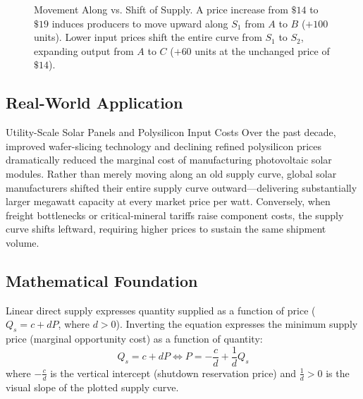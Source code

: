 \documentclass[11pt,letterpaper]{article}
\begin{document}
\begin{figure}[htbp]
\caption{Movement Along vs. Shift of Supply. A price increase from $\$14$ to $\$19$ induces producers to move upward along $S_1$ from $A$ to $B$ ($+100$ units). Lower input prices shift the entire curve from $S_1$ to $S_2$, expanding output from $A$ to $C$ ($+60$ units at the unchanged price of $\$14$).}
\label{fig:supply_shift_vs_movement}
\end{figure}

\subsection*{Real-World Application}
\begin{examplecase}{Utility-Scale Solar Panels and Polysilicon Input Costs}
Over the past decade, improved wafer-slicing technology and declining refined polysilicon prices dramatically reduced the marginal cost of manufacturing photovoltaic solar modules. Rather than merely moving along an old supply curve, global solar manufacturers shifted their entire supply curve outward—delivering substantially larger megawatt capacity at every market price per watt. Conversely, when freight bottlenecks or critical-mineral tariffs raise component costs, the supply curve shifts leftward, requiring higher prices to sustain the same shipment volume.
\end{examplecase}

\subsection*{Mathematical Foundation}
Linear direct supply expresses quantity supplied as a function of price ($Q_s = c + dP$, where $d > 0$). Inverting the equation expresses the minimum supply price (marginal opportunity cost) as a function of quantity:
\begin{equation}
Q_s = c + dP \iff P = -\frac{c}{d} + \frac{1}{d}Q_s
\end{equation}
where $-\frac{c}{d}$ is the vertical intercept (shutdown reservation price) and $\frac{1}{d} > 0$ is the visual slope of the plotted supply curve.
\end{document}
